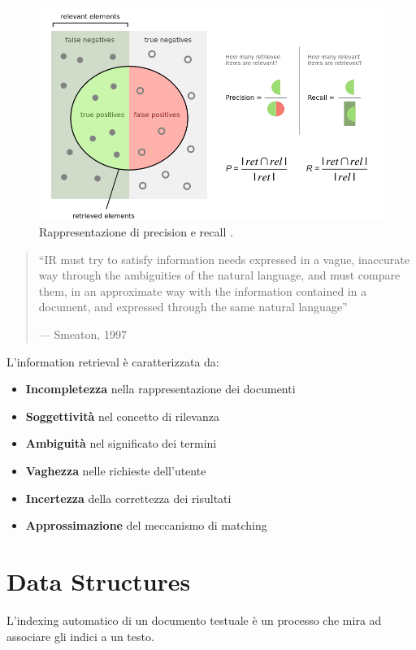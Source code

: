 \begin{figure}[ht]
  \centering
  \includegraphics[width=\linewidth]{images/precisionrecall.png}
  \caption{Rappresentazione di precision e recall \cite{wiki:PrecisionRecall}.}
\end{figure}
\bigskip

\begin{quote}
  “IR must try to satisfy information needs expressed in a
  vague, inaccurate way through the ambiguities of the
  natural language, and must compare them, in an
  approximate way with the information contained in a
  document, and expressed through the same natural
  language”\par\nobreak\smallskip\hfill --- Smeaton, 1997
\end{quote}

L'information retrieval è caratterizzata da:
\begin{itemize}
  \item \textbf{Incompletezza} nella rappresentazione dei documenti
  \item \textbf{Soggettività} nel concetto di rilevanza
  \item \textbf{Ambiguità} nel significato dei termini
  \item \textbf{Vaghezza} nelle richieste dell'utente
  \item \textbf{Incertezza} della correttezza dei risultati
  \item \textbf{Approssimazione} del meccanismo di matching
\end{itemize}

\section{Data Structures}
L'indexing automatico di un documento testuale è un processo che mira ad associare gli indici a un testo.

